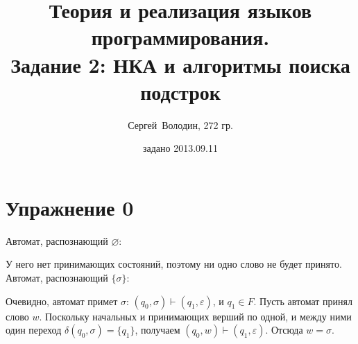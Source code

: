 \documentclass[a4paper]{article}
\title{Теория и реализация языков программирования.\\Задание 2: НКА и алгоритмы поиска подстрок}
\date{задано 2013.09.11}
\author{Сергей~Володин, 272 гр.}
\begin{document}
\maketitle
\section*{Упражнение 0}
Автомат, распознающий $\varnothing$:
\begin{center}
\end{center}
У него нет принимающих состояний, поэтому ни одно слово не будет принято.
\\[10pt]
Автомат, распознающий $\{\sigma\}$:
\begin{center}
\end{center}
Очевидно, автомат примет $\sigma$: $(q_0,\sigma)\vdash(q_1,\varepsilon)$, и $q_1\in F$. Пусть автомат принял слово $w$. Поскольку начальных и принимающих верший по одной, и между ними один переход $\delta(q_0,\sigma)=\{q_1\}$, получаем $(q_0,w)\vdash(q_1,\varepsilon)$. Отсюда $w=\sigma$.
\end{document}
